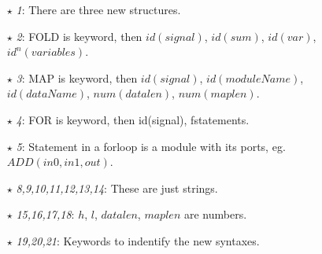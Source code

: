 \begin{itemize}\itemsep2pt \parskip0pt 
  \item[$\star$]\textit{1}: There are three new structures.
  \item[$\star$]\textit{2}: FOLD is keyword, then $id(signal)$, $id(sum)$, $id(var)$, $id^n(variables)$.
  \item[$\star$]\textit{3}: MAP is keyword, then $id(signal)$, $id(moduleName)$, $id(dataName)$, $num(datalen)$,
                            $num(maplen)$.
  \item[$\star$]\textit{4}: FOR is keyword, then id(signal), fstatements.
  \item[$\star$]\textit{5}: Statement in a forloop is a module with its ports, eg. $ADD(in0, in1, out)$.
  \item[$\star$]\textit{8,9,10,11,12,13,14}: These are just strings.
  \item[$\star$]\textit{15,16,17,18}: $h$, $l$, $datalen$, $maplen$ are numbers.
  \item[$\star$]\textit{19,20,21}: Keywords to indentify the new syntaxes.
\end{itemize}
